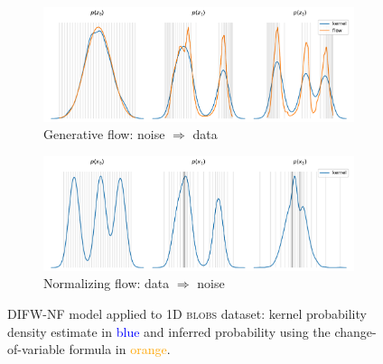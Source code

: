 \begin{figure}[!htb]
    \begin{center}
    \begin{subfigure}[b]{0.48\linewidth}
    \includegraphics[width=\linewidth, trim=0 0 0 20, clip]{figures/1D/BLOBS/plot_generative_flow_evolution.pdf}
    \caption{Generative flow: noise $\Rightarrow$ data}
    \label{fig:nf_1d_example:generative}
    \end{subfigure}
    \hfill{\color{lightgray}\vrule}\hfill
    \begin{subfigure}[b]{0.48\linewidth}
    \includegraphics[width=\linewidth, trim=0 0 0 26, clip]{figures/1D/BLOBS/plot_normalizing_flow_evolution.pdf}
    \caption{Normalizing flow: data $\Rightarrow$ noise}
    \label{fig:nf_1d_example:normalizing}
    \end{subfigure}
\caption{DIFW-NF model applied to 1D \textsc{blobs} dataset: kernel probability density estimate in \textcolor{blue}{blue} and inferred probability using the change-of-variable formula in \textcolor{orange}{orange}.}
\label{fig:nf_1d_example}
\end{center}
\end{figure}

